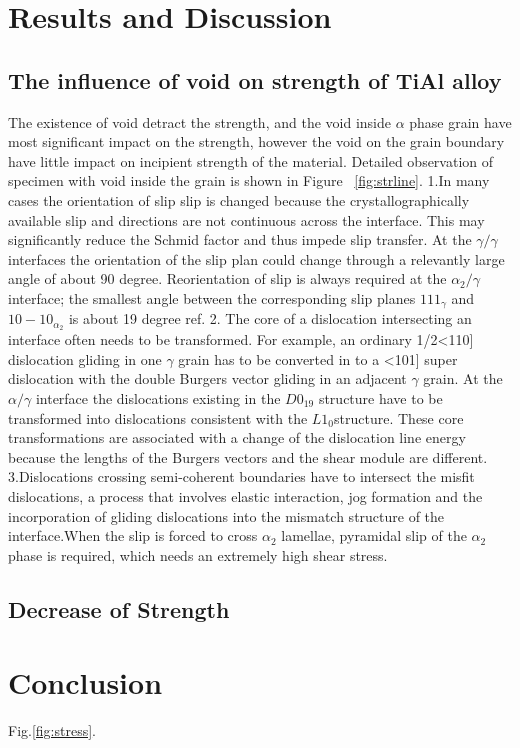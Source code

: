 \documentclass[final,5p,times,twocolumn]{elsarticle}
\begin{document}
\section{Results and Discussion}

\subsection{The influence of void on strength of TiAl alloy}

The existence of void detract the strength, and the void inside $\alpha$ phase grain have most significant  impact on the strength, however the void on the grain boundary have little impact on incipient strength of the material. Detailed observation of specimen with void inside the grain is shown in Figure ~\ref{fig:strline}.
1.In many cases the orientation of slip slip is changed because the crystallographically available slip and directions are not continuous across the interface. This may significantly reduce the Schmid factor and thus impede slip transfer. At the $\gamma/\gamma$ interfaces the orientation of the slip plan could change through a relevantly large angle of about 90 degree. Reorientation of slip is always required at the $\alpha_{2} / \gamma$ interface; the smallest angle between the corresponding slip planes ${1 1 1 }_{\gamma}$ and ${ 1 0 -1 0}_{\alpha_2}$ is about 19 degree ref{}.
2. The core of  a dislocation intersecting an interface often needs to be transformed. For example, an ordinary 1/2<110] dislocation gliding in one $\gamma$ grain has to be converted in to a <101] super dislocation with the double Burgers vector gliding in an adjacent $\gamma$ grain. At the $\alpha/\gamma$ interface the dislocations existing in the $D0_{19}$ structure have to be transformed into dislocations consistent with the $L1_0$structure. These core transformations are associated with a change of the dislocation line energy because the lengths of the Burgers vectors and the shear module are different.
3.Dislocations crossing semi-coherent boundaries have to intersect the misfit dislocations, a process that involves elastic interaction, jog formation and the incorporation of gliding dislocations into the mismatch structure of the interface.When the slip is forced to cross $\alpha_2$ lamellae, pyramidal slip of the $\alpha_2$ phase is required, which needs an extremely high shear stress.



\subsection{Decrease of Strength}


\section{Conclusion}





Fig.\ref{fig:stress}.
\end{document}
